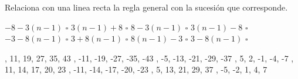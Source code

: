 Relaciona con una linea recta la regla general con la sucesión que corresponde.

\begin{multicols}{2}
    \begin{flushright}
        \begin{choices}
            \choice $-8 -3(n - 1)$ $\square$
            \choice $3(n - 1) + 8 $ $\square$
            \choice $8-3(n - 1) $ $\square$
            \choice $3(n - 1) - 8 $ $\square$
            \choice $-3-8(n - 1)$ $\square$
            \choice $3+8(n - 1)  $ $\square$
            \choice $8(n - 1)  -3$ $\square$
            \choice $3-8(n - 1) $ $\square$
        \end{choices}
    \end{flushright}

    \vspace{1cm}
    \begin{checkboxes}
        , 11, 19, 27, 35, 43       \vspace{0.2cm}
        , -11, -19, -27, -35, -43 \vspace{0.2cm}
        , -5, -13, -21, -29, -37   \vspace{0.2cm}
        , 5, 2, -1, -4, -7         \vspace{0.2cm}
        , 11, 14, 17, 20, 23       \vspace{0.2cm}
        , -11, -14, -17, -20, -23 \vspace{0.2cm}
        , 5, 13, 21, 29, 37       \vspace{0.2cm}
        , -5, -2, 1, 4, 7         \vspace{0.2cm}
    \end{checkboxes}
\end{multicols}


